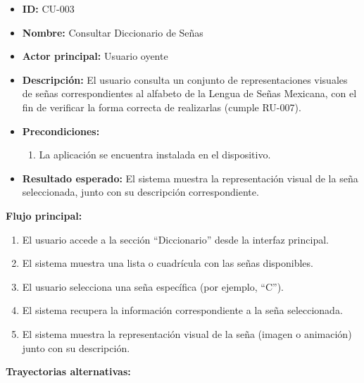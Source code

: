 	\begin{itemize}
		
		\item \textbf{ID:} CU-003
		
		\item \textbf{Nombre:} Consultar Diccionario de Señas
		
		\item \textbf{Actor principal:} Usuario oyente
		
		\item \textbf{Descripción:} El usuario consulta un conjunto de representaciones visuales de señas correspondientes al alfabeto de la Lengua de Señas Mexicana, con el fin de verificar la forma correcta de realizarlas (cumple RU-007).
		
		\item \textbf{Precondiciones:}
		\begin{enumerate}
			\item La aplicación se encuentra instalada en el dispositivo.
		\end{enumerate}
		
		\item \textbf{Resultado esperado:} El sistema muestra la representación visual de la seña seleccionada, junto con su descripción correspondiente.
		
	\end{itemize}
	
	\textbf{Flujo principal:}
	
	\begin{enumerate}
		\item El usuario accede a la sección ``Diccionario'' desde la interfaz principal.
		\item El sistema muestra una lista o cuadrícula con las señas disponibles.
		\item El usuario selecciona una seña específica (por ejemplo, ``C'').
		\item El sistema recupera la información correspondiente a la seña seleccionada.
		\item El sistema muestra la representación visual de la seña (imagen o animación) junto con su descripción.
		
	\end{enumerate}
	
	\textbf{Trayectorias alternativas:}
	

